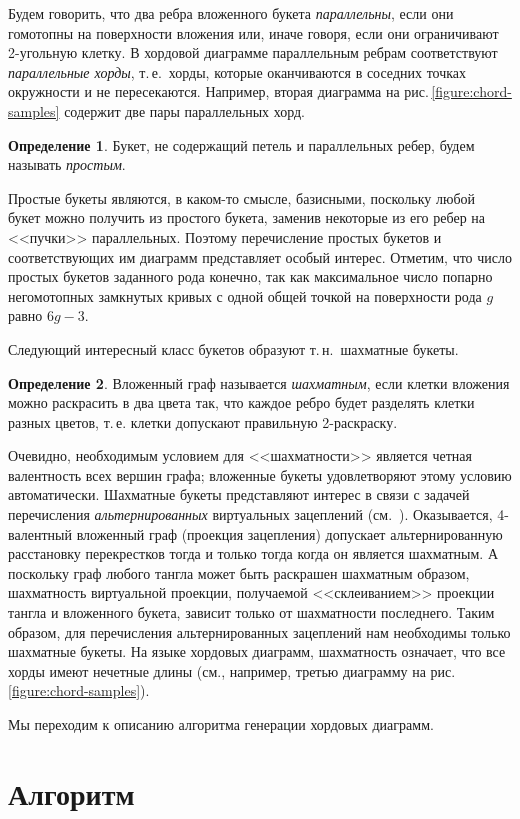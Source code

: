 \documentclass[a4paper,12pt]{article}
\def\figureref#1{рис.\,\protect\ref{#1}}
\let\picref=\figureref
\theoremstyle{plain}
\theoremstyle{definition}
\newtheorem{definition}{Определение}
\begin{document}
Будем говорить, что два ребра вложенного букета \textit{параллельны}, если они гомотопны на поверхности вложения или, иначе
говоря, если они ограничивают 2-угольную клетку. В хордовой диаграмме параллельным ребрам соответствуют \textit{параллельные
хорды}, т.\,е.~хорды, которые оканчиваются в соседних точках окружности и не пересекаются. Например, вторая диаграмма на
\picref{figure:chord-samples} содержит две пары параллельных хорд.
\begin{definition}
Букет, не содержащий петель и параллельных ребер, будем называть \textit{простым}.
\end{definition}
Простые букеты являются, в каком-то смысле, базисными, поскольку любой букет можно получить из простого букета, заменив
некоторые из его ребер на <<пучки>> параллельных. Поэтому перечисление простых букетов и соответствующих им диаграмм
представляет особый интерес. Отметим, что число простых букетов заданного рода конечно, так как максимальное число попарно
негомотопных замкнутых кривых с одной общей точкой на поверхности рода $g$ равно $6g-3$.

Следующий интересный класс букетов образуют т.\,н.~шахматные букеты.
\begin{definition}
Вложенный граф называется \textit{шахматным}, если клетки вложения можно раскрасить в два цвета так, что каждое ребро будет
разделять клетки разных цветов, т.\,е. клетки допускают правильную 2-раскраску.
\end{definition}
Очевидно, необходимым условием для <<шахматности>> является четная валентность всех вершин графа; вложенные букеты
удовлетворяют этому условию автоматически. Шахматные букеты представляют интерес в связи с задачей перечисления
\textit{альтернированных} виртуальных зацеплений (см.~\cite{We_Tangles2010}). Оказывается, 4-валентный вложенный граф (проекция
зацепления) допускает альтернированную расстановку перекрестков тогда и только тогда когда он является шахматным. А поскольку
граф любого тангла может быть раскрашен шахматным образом, шахматность виртуальной проекции, получаемой <<склеиванием>>
проекции тангла и вложенного букета, зависит только от шахматности последнего. Таким образом, для перечисления альтернированных
зацеплений нам необходимы только шахматные букеты. На языке хордовых диаграмм, шахматность означает, что все хорды имеют
нечетные длины (см., например, третью диаграмму на \picref{figure:chord-samples}).

Мы переходим к описанию алгоритма генерации хордовых диаграмм.


\section{Алгоритм}
\end{document}
